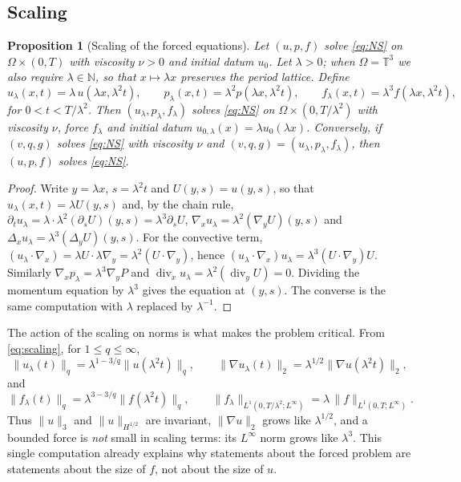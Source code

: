 \documentclass[11pt]{article}
\newtheorem{proposition}[theorem]{Proposition}
\theoremstyle{remark}
\newcommand{\T}{\mathbb{T}}
\newcommand{\norm}[1]{\lVert #1\rVert}
\newcommand{\Div}{\operatorname{div}}
\begin{document}
\subsection{Scaling}

\begin{proposition}[Scaling of the forced equations]\label{prop:scaling}
Let $(u,p,f)$ solve \eqref{eq:NS} on $\Omega\times(0,T)$ with viscosity $\nu>0$ and initial
datum $u_0$. Let $\lambda>0$; when $\Omega=\T^3$ we also require $\lambda\in\mathbb{N}$,
so that $x\mapsto\lambda x$ preserves the period lattice. Define
\begin{equation}\label{eq:scaling}
u_\lambda(x,t)=\lambda\,u(\lambda x,\lambda^2 t),\qquad
p_\lambda(x,t)=\lambda^2 p(\lambda x,\lambda^2 t),\qquad
f_\lambda(x,t)=\lambda^3 f(\lambda x,\lambda^2 t),
\end{equation}
for $0<t<T/\lambda^2$. Then $(u_\lambda,p_\lambda,f_\lambda)$ solves \eqref{eq:NS} on
$\Omega\times(0,T/\lambda^2)$ with viscosity $\nu$, force $f_\lambda$ and initial datum
$u_{0,\lambda}(x)=\lambda u_0(\lambda x)$. Conversely, if $(v,q,g)$ solves \eqref{eq:NS} with
viscosity $\nu$ and $(v,q,g)=(u_\lambda,p_\lambda,f_\lambda)$, then $(u,p,f)$ solves
\eqref{eq:NS}.
\end{proposition}

\begin{proof}
Write $y=\lambda x$, $s=\lambda^2 t$ and $U(y,s)=u(y,s)$, so that $u_\lambda(x,t)=\lambda
U(y,s)$ and, by the chain rule,
$\partial_t u_\lambda=\lambda\cdot\lambda^2(\partial_sU)(y,s)=\lambda^3\partial_sU$,
$\nabla_xu_\lambda=\lambda^2(\nabla_yU)(y,s)$ and
$\Delta_xu_\lambda=\lambda^3(\Delta_yU)(y,s)$.
For the convective term, $(u_\lambda\cdot\nabla_x)=\lambda U\cdot\lambda\nabla_y
=\lambda^2(U\cdot\nabla_y)$, hence
$(u_\lambda\cdot\nabla_x)u_\lambda=\lambda^3(U\cdot\nabla_y)U$. Similarly
$\nabla_xp_\lambda=\lambda^3\nabla_yP$ and $\Div_xu_\lambda=\lambda^2(\Div_yU)=0$. Dividing
the momentum equation by $\lambda^3$ gives the equation at $(y,s)$. The converse is the same
computation with $\lambda$ replaced by $\lambda^{-1}$.
\end{proof}

The action of the scaling on norms is what makes the problem critical. From
\eqref{eq:scaling}, for $1\le q\le\infty$,
\begin{equation}\label{eq:normscaling}
\norm{u_\lambda(t)}_{q}=\lambda^{1-3/q}\norm{u(\lambda^2t)}_{q},\qquad
\norm{\nabla u_\lambda(t)}_{2}=\lambda^{1/2}\norm{\nabla u(\lambda^2t)}_{2},
\end{equation}
and
\begin{equation}\label{eq:forcescaling}
\norm{f_\lambda(t)}_{q}=\lambda^{3-3/q}\norm{f(\lambda^2t)}_{q},\qquad
\norm{f_\lambda}_{L^1(0,T/\lambda^2;L^\infty)}=\lambda\,\norm{f}_{L^1(0,T;L^\infty)}.
\end{equation}
Thus $\norm{u}_{3}$ and $\norm{u}_{H^{1/2}}$ are invariant, $\norm{\nabla u}_{2}$ grows like
$\lambda^{1/2}$, and a bounded force is \emph{not} small in scaling terms: its $L^\infty$ norm
grows like $\lambda^{3}$. This single computation already explains why statements about the
forced problem are statements about the size of $f$, not about the size of $u$.
\end{document}

